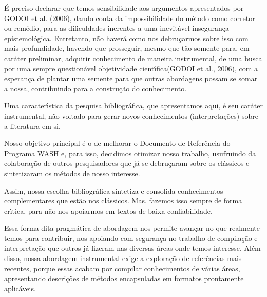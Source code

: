 \documentclass[
12pt,		%
openright,	%
twoside,  %
a4paper,			%
chapter=TITLE,		%
english,			%
french,				%
spanish,			%
brazil				%
]{USPSC-classe/USPSC}
\begin{document}
\'E preciso declarar que temos sensibilidade aos argumentos apresentados por GODOI et al. (2006), dando conta da impossibilidade \textquotedbl  do m\'etodo como corretor ou rem\'edio, para as dificuldades \textquotedbl  inerentes a uma inevit\'avel inseguran\c{c}a epistemol\'ogica\textquotedbl . Entretanto, n\~ao haver\'a como nos debru\c{c}armos sobre isso com mais profundidade, havendo que prosseguir, mesmo que t\~ao somente para, em car\'ater preliminar, \textquotedbl adquirir conhecimento de maneira instrumental\textquotedbl , de uma busca por uma sempre question\'avel \textquotedbl objetividade cient\'{\i}fica\textquotedbl  (GODOI et al., 2006), com a esperan\c{c}a de plantar uma semente para que outras abordagens possam se somar a nossa, contribuindo para a constru\c{c}\~ao do conhecimento.








Uma caracter\'{\i}stica da pesquisa bibliogr\'afica, que apresentamos aqui, \'e seu  car\'ater instrumental, n\~ao voltado para gerar novos conhecimentos (interpreta\c{c}\~oes) sobre a literatura em si.








Nosso objetivo principal \'e o de melhorar o Documento de Refer\^encia do Programa WASH e, para isso, decidimos otimizar nosso trabalho, usufruindo da colabora\c{c}\~ao de outros pesquisadores que j\'a se debru\c{c}aram sobre os cl\'assicos e  sintetizaram os m\'etodos de nosso interesse.








Assim, nossa escolha bibliogr\'afica sintetiza e consolida conhecimentos complementares que est\~ao nos cl\'assicos. Mas, fazemos isso sempre de forma cr\'{\i}tica, para n\~ao nos apoiarmos em textos de baixa confiabilidade.








Essa forma dita \textquotedbl  pragm\'atica \textquotedbl  de abordagem nos permite avan\c{c}ar no que realmente temos para contribuir, nos apoiando com seguran\c{c}a no trabalho de compila\c{c}\~ao e interpreta\c{c}\~ao que outros j\'a fizeram nas diversas \'areas onde temos interesse. Al\'em disso, nossa abordagem instrumental exige a explora\c{c}\~ao de refer\^encias mais recentes, porque essas acabam por compilar conhecimentos de v\'arias \'areas, apresentando descri\c{c}\~oes de m\'etodos encapsuladas em formatos prontamente aplic\'aveis.
\end{document}
